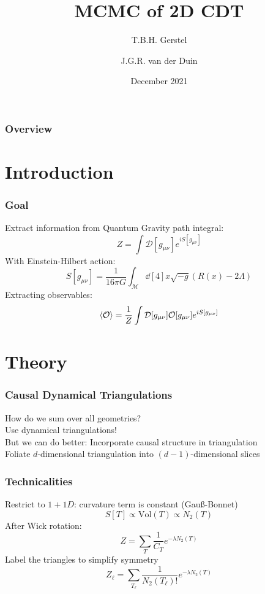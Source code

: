 \documentclass{beamer}
\title{MCMC of 2D CDT}
\author{T.B.H. Gerstel \and J.G.R. van der Duin}
\date{December 2021}
\institute{Radboud University Nijmegen}
\begin{document}
\frame{\titlepage}

\begin{frame}
    \frametitle{Overview}
    \tableofcontents
\end{frame}

\section{Introduction}

\begin{frame}
    \frametitle{Goal}
    Extract information from Quantum Gravity path integral:
    \begin{equation}
        Z = \int \mathcal{D}[g_{\mu \nu}] e^{i S[g_{\mu \nu}]}
    \end{equation}
    With Einstein-Hilbert action:
    \begin{equation}
        S[g_{\mu \nu}]
        =
        \frac{1}{16 \pi G}
        \int_\mathcal{M} \dd[4]{x} \sqrt{-g}
        (R(x) - 2 \Lambda)
    \end{equation}
    Extracting observables:
    \begin{equation}
        \ev{\mathcal{O}}
        =
        \frac{1}{Z} \int \mathcal{D}[g_{\mu \nu}]
        \mathcal{O}[g_{\mu \nu}]
        e^{i S[g_{\mu \nu}]}
    \end{equation}
\end{frame}

\section{Theory}

\begin{frame}
    \frametitle{Causal Dynamical Triangulations}
    How do we sum over all geometries? \\
    Use dynamical triangulations! \\
    But we can do better: Incorporate causal structure in triangulation \\
    Foliate $d$-dimensional triangulation into $(d - 1)$-dimensional slices \\
\end{frame}

\begin{frame}
    \frametitle{Technicalities}
    Restrict to $1 + 1D$: curvature term is constant (Gau\ss -Bonnet) \\
    \begin{equation}
        S[T] \propto \text{Vol}(T) \propto N_2(T)
    \end{equation}
    After Wick rotation:
    \begin{equation}
        Z = \sum_{T} \frac{1}{C_T} e^{-\lambda N_2(T)}
    \end{equation}
    Label the triangles to simplify symmetry
    \begin{equation}
        Z_\ell = \sum _{T_\ell} \frac{1}{N_2(T_\ell)!} e^{-\lambda N_2(T)}
    \end{equation}
\end{frame}
\end{document}
